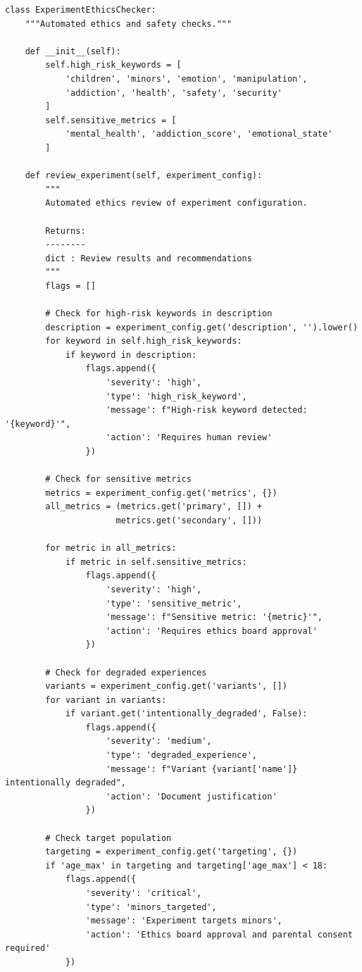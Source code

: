 \begin{lstlisting}
class ExperimentEthicsChecker:
    """Automated ethics and safety checks."""

    def __init__(self):
        self.high_risk_keywords = [
            'children', 'minors', 'emotion', 'manipulation',
            'addiction', 'health', 'safety', 'security'
        ]
        self.sensitive_metrics = [
            'mental_health', 'addiction_score', 'emotional_state'
        ]

    def review_experiment(self, experiment_config):
        """
        Automated ethics review of experiment configuration.

        Returns:
        --------
        dict : Review results and recommendations
        """
        flags = []

        # Check for high-risk keywords in description
        description = experiment_config.get('description', '').lower()
        for keyword in self.high_risk_keywords:
            if keyword in description:
                flags.append({
                    'severity': 'high',
                    'type': 'high_risk_keyword',
                    'message': f"High-risk keyword detected: '{keyword}'",
                    'action': 'Requires human review'
                })

        # Check for sensitive metrics
        metrics = experiment_config.get('metrics', {})
        all_metrics = (metrics.get('primary', []) +
                      metrics.get('secondary', []))

        for metric in all_metrics:
            if metric in self.sensitive_metrics:
                flags.append({
                    'severity': 'high',
                    'type': 'sensitive_metric',
                    'message': f"Sensitive metric: '{metric}'",
                    'action': 'Requires ethics board approval'
                })

        # Check for degraded experiences
        variants = experiment_config.get('variants', [])
        for variant in variants:
            if variant.get('intentionally_degraded', False):
                flags.append({
                    'severity': 'medium',
                    'type': 'degraded_experience',
                    'message': f"Variant {variant['name']} intentionally degraded",
                    'action': 'Document justification'
                })

        # Check target population
        targeting = experiment_config.get('targeting', {})
        if 'age_max' in targeting and targeting['age_max'] < 18:
            flags.append({
                'severity': 'critical',
                'type': 'minors_targeted',
                'message': 'Experiment targets minors',
                'action': 'Ethics board approval and parental consent required'
            })


\end{lstlisting}
